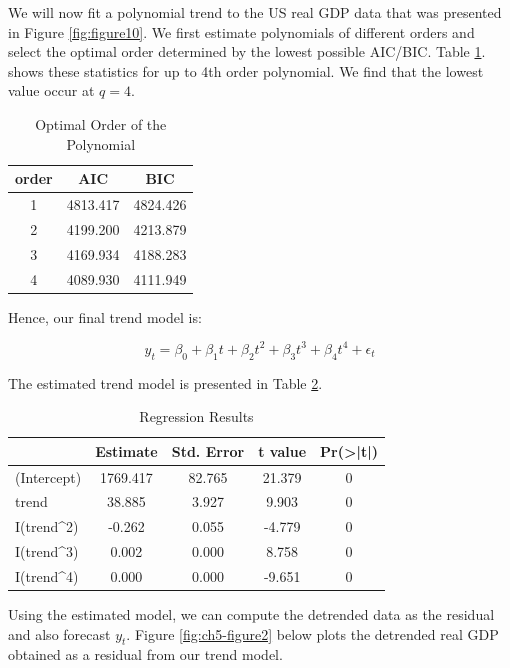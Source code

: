 \documentclass[]{book}
\theoremstyle{definition}
\theoremstyle{definition}
\theoremstyle{definition}
\theoremstyle{remark}
\begin{document}
We will now fit a polynomial trend to the US real GDP data that was presented in Figure \ref{fig:figure10}. We first estimate polynomials of different orders and select the optimal order determined by the lowest possible AIC/BIC. Table \ref{tab:ch5-table1}. shows these statistics for up to 4th order polynomial. We find that the lowest value occur at \(q=4\).

\begin{table}[t]

\caption{\label{tab:ch5-table1}Optimal Order of the Polynomial}
\centering
\begin{tabular}{ccc}
\toprule
order & AIC & BIC\\
\midrule
1 & 4813.417 & 4824.426\\
2 & 4199.200 & 4213.879\\
3 & 4169.934 & 4188.283\\
4 & 4089.930 & 4111.949\\
\bottomrule
\end{tabular}
\end{table}

Hence, our final trend model is:

\begin{equation}
y_t=\beta_0 +\beta_1 t + \beta_2 t^2 + \beta_3 t^3 + \beta_4 t^4 +\epsilon_t
\end{equation}

The estimated trend model is presented in Table \ref{tab:ch5-table2}.

\begin{table}[t]

\caption{\label{tab:ch5-table2}Regression Results}
\centering
\begin{tabular}{lcccc}
\toprule
  & Estimate & Std. Error & t value & Pr(>|t|)\\
\midrule
(Intercept) & 1769.417 & 82.765 & 21.379 & 0\\
trend & 38.885 & 3.927 & 9.903 & 0\\
I(trend\textasciicircum{}2) & -0.262 & 0.055 & -4.779 & 0\\
I(trend\textasciicircum{}3) & 0.002 & 0.000 & 8.758 & 0\\
I(trend\textasciicircum{}4) & 0.000 & 0.000 & -9.651 & 0\\
\bottomrule
\end{tabular}
\end{table}

Using the estimated model, we can compute the detrended data as the residual and also forecast \(y_t\). Figure \ref{fig:ch5-figure2} below plots the detrended real GDP obtained as a residual from our trend model.
\end{document}
